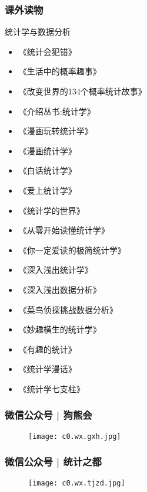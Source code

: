 \begin{frame}
  \frametitle{课外读物}
    \begin{block}{统计学与数据分析}
      \begin{multicols}{2}
      \begin{itemize}
         \item 《统计会犯错》
         \item 《生活中的概率趣事》
         \item 《改变世界的134个概率统计故事》
         \item 《介绍丛书:统计学》
         \item 《漫画玩转统计学》
         \item 《漫画统计学》
         \item 《白话统计学》
         \item 《爱上统计学》
         \item 《统计学的世界》
         \item 《从零开始读懂统计学》
         \item 《你一定爱读的极简统计学》
         \item 《深入浅出统计学》
         \item 《深入浅出数据分析》
         \item 《菜鸟侦探挑战数据分析》
         \item 《妙趣横生的统计学》
         \item 《有趣的统计》
         \item 《统计学漫话》
         \item 《统计学七支柱》
        \end{itemize}
      \end{multicols}
    \end{block}
\end{frame}

\begin{frame}
  \frametitle{微信公众号 | 狗熊会}
  \begin{figure}
    \centering
    \texttt{[image: c0.wx.gxh.jpg]}
  \end{figure}
\end{frame}

\begin{frame}
  \frametitle{微信公众号 | 统计之都}
  \begin{figure}
    \centering
    \texttt{[image: c0.wx.tjzd.jpg]}
  \end{figure}
\end{frame}

